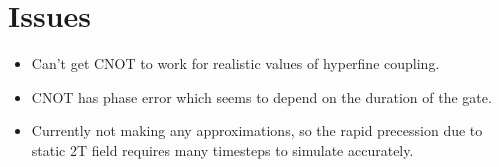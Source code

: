 \documentclass[12pt]{article}
\begin{document}
\section{Issues}
\begin{itemize}
    \item Can't get CNOT to work for realistic values of hyperfine coupling.
    \item CNOT has phase error which seems to depend on the duration of the gate.
    \item Currently not making any approximations, so the rapid precession due to static 2T field requires many timesteps to simulate accurately.
\end{itemize}
\end{document}
